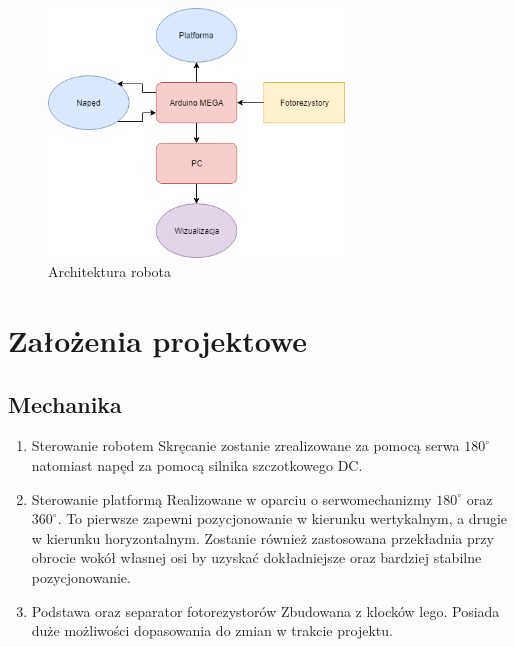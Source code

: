 \documentclass[10pt, a4paper]{article}
\begin{document}
	\begin{figure}[H]
		\centering
		\includegraphics[width=0.7\textwidth]{diag3.png}
		\caption{Architektura robota}
		\label{fig:Architektura robota}
	\end{figure}

\section{Założenia projektowe}

\subsection{Mechanika}
\begin{enumerate}
	\item Sterowanie robotem
	\newline
	Skręcanie zostanie zrealizowane za pomocą serwa $180^\circ$ natomiast napęd za pomocą silnika szczotkowego DC.
	
	\item Sterowanie platformą
	\newline
	Realizowane w oparciu o serwomechanizmy $180^\circ$ oraz $360^\circ$. To pierwsze zapewni pozycjonowanie w  kierunku wertykalnym, a drugie w kierunku horyzontalnym. Zostanie również zastosowana przekładnia przy obrocie wokół własnej osi by uzyskać dokładniejsze oraz bardziej stabilne pozycjonowanie.
	
	\item Podstawa oraz separator fotorezystorów
	\newline
	Zbudowana z klocków lego. Posiada duże możliwości dopasowania do zmian w trakcie projektu.
	
\end{enumerate}
\end{document}
